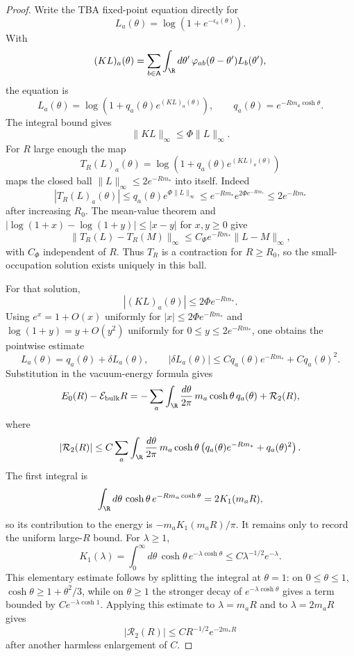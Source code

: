 \begin{proof}
Write the TBA fixed-point equation directly for
\[
  L_a(\theta)=\log(1+e^{-\epsilon_a(\theta)}).
\]
With
\[
  (K L)_a(\theta)
  =
  \sum_{b\in\mathsf A}\int_{\R}d\theta'\,
  \varphi_{ab}(\theta-\theta')L_b(\theta'),
\]
the equation is
\[
  L_a(\theta)
  =
  \log\!\left(1+q_a(\theta)e^{(K L)_a(\theta)}\right),
  \qquad
  q_a(\theta)=e^{-Rm_a\cosh\theta}.
\]
The integral bound gives
\[
  \|K L\|_\infty\le \Phi\|L\|_\infty .
\]
For \(R\) large enough the map
\[
  T_R(L)_a(\theta)
  =
  \log\!\left(1+q_a(\theta)e^{(K L)_a(\theta)}\right)
\]
maps the closed ball
\(\|L\|_\infty\le 2e^{-Rm_*}\) into itself.  Indeed
\[
  |T_R(L)_a(\theta)|
  \le q_a(\theta)e^{\Phi\|L\|_\infty}
  \le e^{-Rm_*}e^{2\Phi e^{-Rm_*}}
  \le 2e^{-Rm_*}
\]
after increasing \(R_0\).  The mean-value theorem and
\(|\log(1+x)-\log(1+y)|\le |x-y|\) for \(x,y\ge0\) give
\[
  \|T_R(L)-T_R(M)\|_\infty
  \le
  C_\Phi e^{-Rm_*}\|L-M\|_\infty ,
\]
with \(C_\Phi\) independent of \(R\).  Thus \(T_R\) is a contraction for
\(R\ge R_0\), so the small-occupation solution exists uniquely in this ball.

For that solution,
\[
  |(K L)_a(\theta)|\le 2\Phi e^{-Rm_*}.
\]
Using \(e^x=1+O(x)\) uniformly for
\(|x|\le 2\Phi e^{-Rm_*}\) and
\(\log(1+y)=y+O(y^2)\) uniformly for
\(0\le y\le 2e^{-Rm_*}\), one obtains the pointwise estimate
\[
  L_a(\theta)
  =
  q_a(\theta)+\delta L_a(\theta),
  \qquad
  |\delta L_a(\theta)|
  \le
  C q_a(\theta)e^{-Rm_*}+C q_a(\theta)^2 .
\]
Substitution in the vacuum-energy formula gives
\[
  E_0(R)-\mathcal E_{\mathrm{bulk}}R
  =
  -\sum_a\int_{\R}\frac{d\theta}{2\pi}\,
  m_a\cosh\theta\,q_a(\theta)+\mathcal R_2(R),
\]
where
\[
  |\mathcal R_2(R)|
  \le
  C\sum_a
  \int_{\R}\frac{d\theta}{2\pi}\,
  m_a\cosh\theta
  \left(q_a(\theta)e^{-Rm_*}+q_a(\theta)^2\right).
\]
The first integral is
\[
  \int_{\R}d\theta\,\cosh\theta\,e^{-Rm_a\cosh\theta}
  =
  2K_1(m_aR),
\]
so its contribution to the energy is
\(-m_aK_1(m_aR)/\pi\).  It remains only to record the uniform large-\(R\)
bound.  For \(\lambda\ge1\),
\[
  K_1(\lambda)
  =
  \int_0^\infty d\theta\,\cosh\theta\,e^{-\lambda\cosh\theta}
  \le
  C\lambda^{-1/2}e^{-\lambda}.
\]
This elementary estimate follows by splitting the integral at
\(\theta=1\): on \(0\le\theta\le1\), \(\cosh\theta\ge 1+\theta^2/3\), while
on \(\theta\ge1\) the stronger decay of \(e^{-\lambda\cosh\theta}\) gives a
term bounded by \(C e^{-\lambda\cosh 1}\).  Applying this estimate to
\(\lambda=m_aR\) and to \(\lambda=2m_aR\) gives
\[
  |\mathcal R_2(R)|\le C R^{-1/2}e^{-2m_*R}
\]
after another harmless enlargement of \(C\).
\end{proof}


